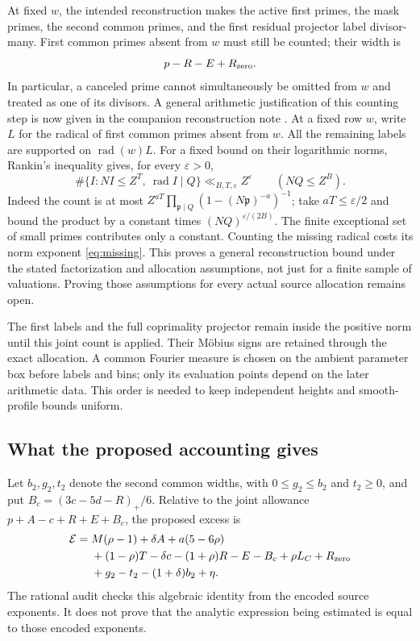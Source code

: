 \documentclass[11pt]{article}
\theoremstyle{definition}
\newcommand{\eps}{\varepsilon}
\begin{document}
At fixed $w$, the intended reconstruction makes the active first primes,
the mask primes, the second common primes, and the first residual
projector label divisor-many. First common primes absent from $w$ must
still be counted; their width is
\begin{equation}\label{eq:missing}
 p-R-E+R_{\rm zero}.
\end{equation}
In particular, a canceled prime cannot simultaneously be omitted from
$w$ and treated as one of its divisors. A general arithmetic justification
of this counting step is now given in the companion reconstruction note
\cite{gaov2}. At a fixed row $w$, write $L$ for the radical of first
common primes absent from $w$. All the remaining labels are supported
on $\operatorname{rad}(w)L$. For a fixed bound on their logarithmic norms,
Rankin's inequality gives, for every $\eps>0$,
\[
 \#\{I:NI\le Z^T,\ \operatorname{rad}I\mid Q\}
 \ll_{B,T,\eps}Z^\eps\qquad(NQ\le Z^B).
\]
Indeed the count is at most
$Z^{aT}\prod_{\mathfrak p\mid Q}(1-(N\mathfrak p)^{-a})^{-1}$;
take $aT\le\eps/2$ and bound the product by a constant times
$(NQ)^{\eps/(2B)}$. The finite exceptional set of small primes contributes
only a constant. Counting the missing radical costs its norm exponent
\eqref{eq:missing}. This proves a general reconstruction bound under
the stated factorization and allocation assumptions, not just for a
finite sample of valuations. Proving those assumptions for every actual
source allocation remains open.

The first labels and the full coprimality projector remain inside the
positive norm until this joint count is applied. Their M\"obius signs
are retained through the exact allocation. A common Fourier measure is
chosen on the ambient parameter box before labels and bins; only its
evaluation points depend on the later arithmetic data. This order is
needed to keep independent heights and smooth-profile bounds uniform.

\subsection{What the proposed accounting gives}
Let $b_2,g_2,t_2$ denote the second common widths, with
$0\le g_2\le b_2$ and $t_2\ge0$, and put
$B_c=(3c-5d-R)_+/6$. Relative to the joint allowance
$p+A-c+R+E+B_c$, the proposed excess is
\begin{align}\label{eq:ledger}
 \mathcal E={}&M(\rho-1)+\delta A+a(5-6\rho)\notag\\
 &+(1-\rho)T-\delta c-(1+\rho)R-E-B_c
      +\rho L_C+R_{\rm zero}\notag\\
 &+g_2-t_2-(1+\delta)b_2+\eta.
\end{align}
The rational audit checks this algebraic identity from the encoded
source exponents. It does not prove that the analytic expression being
estimated is equal to those encoded exponents.
\end{document}
